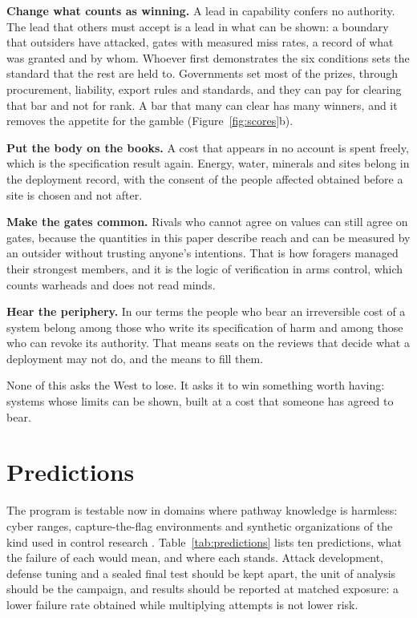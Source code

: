 \documentclass[10pt,twocolumn,letterpaper]{article}
\theoremstyle{definition}
\newcommand{\para}[1]{\smallskip\noindent\textbf{#1}\enspace}
\begin{document}
\para{Change what counts as winning.} A lead in capability confers no authority. The lead that others must accept is a lead in what can be shown: a boundary that outsiders have attacked, gates with measured miss rates, a record of what was granted and by whom. Whoever first demonstrates the six conditions sets the standard that the rest are held to. Governments set most of the prizes, through procurement, liability, export rules and standards, and they can pay for clearing that bar and not for rank. A bar that many can clear has many winners, and it removes the appetite for the gamble (Figure~\ref{fig:scores}b).

\para{Put the body on the books.} A cost that appears in no account is spent freely, which is the specification result again. Energy, water, minerals and sites belong in the deployment record, with the consent of the people affected obtained before a site is chosen and not after.

\para{Make the gates common.} Rivals who cannot agree on values can still agree on gates, because the quantities in this paper describe reach and can be measured by an outsider without trusting anyone's intentions. That is how foragers managed their strongest members, and it is the logic of verification in arms control, which counts warheads and does not read minds.

\para{Hear the periphery.} In our terms the people who bear an irreversible cost of a system belong among those who write its specification of harm and among those who can revoke its authority. That means seats on the reviews that decide what a deployment may not do, and the means to fill them.

None of this asks the West to lose. It asks it to win something worth having: systems whose limits can be shown, built at a cost that someone has agreed to bear.

\section{Predictions}
\label{sec:predictions}

The program is testable now in domains where pathway knowledge is harmless: cyber ranges, capture-the-flag environments and synthetic organizations of the kind used in control research \cite{makins}. Table~\ref{tab:predictions} lists ten predictions, what the failure of each would mean, and where each stands. Attack development, defense tuning and a sealed final test should be kept apart, the unit of analysis should be the campaign, and results should be reported at matched exposure: a lower failure rate obtained while multiplying attempts is not lower risk.
\end{document}

